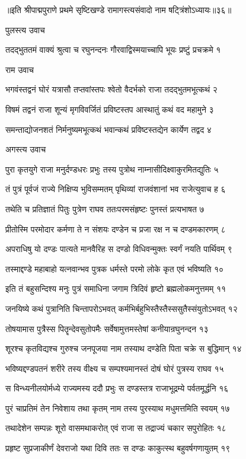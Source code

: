 ॥इति श्रीपाद्मपुराणे प्रथमे सृष्टिखण्डे रामागस्त्यसंवादो नाम षट्त्रिंशोऽध्यायः॥३६॥


पुलस्त्य उवाच

तदद्भुततमं वाक्यं श्रुत्वा च रघुनन्दनः
गौरवाद्विस्मयाच्चापि भूयः प्रष्टुं प्रचक्रमे १

राम उवाच

भगवंस्तद्वनं घोरं यत्रासौ तप्तवांस्तपः
श्वेतो वैदर्भको राजा तदद्भुतमभूत्कथं २

विषमं तद्वनं राजा शून्यं मृगविवर्जितं
प्रविष्टस्तप आस्थातुं कथं वद महामुने ३

समन्ताद्योजनशतं निर्मनुष्यमभूत्कथं
भवान्कथं प्रविष्टस्तद्येन कार्येण तद्वद ४

अगस्त्य उवाच

पुरा कृतयुगे राजा मनुर्दण्डधरः प्रभुः
तस्य पुत्रोथ नाम्नासीदिक्ष्वाकुरमितद्युतिः ५

तं पुत्रं पूर्वजं राज्ये निक्षिप्य भुविसम्मतम्
पृथिव्यां राजवंशानां भव राजेत्युवाच ह ६

तथेति च प्रतिज्ञातं पितुः पुत्रेण राघव
ततःपरमसंहृष्टः पुनस्तं प्रत्यभाषत ७

प्रीतोस्मि परमोदार कर्मणा ते न संशयः
दण्डेन च प्रजा रक्ष न च दण्डमकारणम् ८

अपराधिषु यो दण्डः पात्यते मानवैरिह
स दण्डो विधिवन्मुक्तः स्वर्गं नयति पार्थिवम् ९

तस्माद्दण्डे महाबाहो यत्नवान्भव पुत्रक
धर्मस्ते परमो लोके कृत एवं भविष्यति १०

इति तं बहुसन्दिश्य मनुः पुत्रं समाधिना
जगाम त्रिदिवं हृष्टो ब्रह्मलोकमनुत्तमम् ११

जनयिष्ये कथं पुत्रानिति चिन्तापरोऽभवत्
कर्मभिर्बहुभिस्तैस्तैस्ससुतैस्संयुतोऽभवत् १२

तोषयामास पुत्रैस्स पितॄन्देवसुतोपमैः
सर्वेषामुत्तमस्तेषां कनीयान्रघुनन्दन १३

शूरश्च कृतविद्यश्च गुरुश्च जनपूजया
नाम तस्याथ दण्डेति पिता चक्रे स बुद्धिमान् १४

भविष्यद्दण्डपतनं शरीरे तस्य वीक्ष्य च
सम्पश्यमानस्तं दोषं घोरं पुत्रस्य राघव १५

स विन्ध्यनीलयोर्मध्ये राज्यमस्य ददौ प्रभुः
स दण्डस्तत्र राजाभूद्रम्ये पर्वतमूर्द्धनि १६

पुरं चाप्रतिमं तेन निवेशाय तथा कृतम्
नाम तस्य पुरस्याथ मधुमत्तमिति स्वयम् १७

तथादेशेन सम्पन्नः शूरो वासमथाकरोत्
एवं राजा स तद्राज्यं चकार सपुरोहितः १८

प्रहृष्ट सुप्रजाकीर्णं देवराजो यथा दिवि
ततः स दण्डः काकुत्स्थ बहुवर्षगणायुतम् १९

